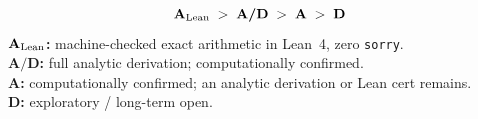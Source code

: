 \documentclass[11pt]{article}
\theoremstyle{remark}
\newcommand{\CatA}{\textbf{A}}
\newcommand{\CatAL}{\ensuremath{\textbf{A}_{\rm Lean}}}
\newcommand{\CatAD}{\textbf{A/D}}
\newcommand{\CatD}{\textbf{D}}
\begin{document}
\begin{tcolorbox}[colback=gray!4,colframe=gray!50!black,
  title={\textbf{Claim-strength taxonomy}},
  fonttitle=\bfseries,left=6pt,right=6pt,top=5pt,bottom=5pt]
\small
\[
\CatAL \;>\; \CatAD \;>\; \CatA \;>\; \CatD
\]
\textbf{$\CatAL$:} machine-checked exact arithmetic in Lean~4, zero \texttt{sorry}.\\
\textbf{$\CatAD$:} full analytic derivation; computationally confirmed.\\
\textbf{$\CatA$:} computationally confirmed; an analytic derivation or Lean cert remains.\\
\textbf{$\CatD$:} exploratory / long-term open.
\end{tcolorbox}
\end{document}
